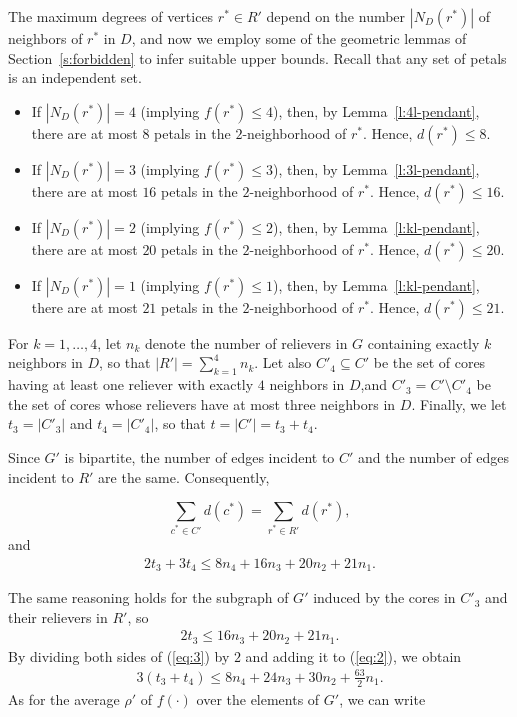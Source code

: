 \documentclass[preprint,12pt]{elsarticle}
\begin{document}
\begin{pf}
The maximum degrees of vertices $r^* \in R'$ depend on the number $|N_D(r^*)|$ of neighbors of $r^*$ in $D$, and now we employ some of the geometric lemmas of Section~\ref{s:forbidden} to infer suitable upper bounds. Recall that any set of petals is an independent set.
\begin{itemize}
\item If $|N_D(r^*)| = 4$ (implying $f(r^*) \leq 4$), then, by Lemma~\ref{l:4l-pendant}, there are at most $8$ petals in the $2$-neighborhood of $r^*$. Hence, $d(r^*) \leq 8$.
\item If $|N_D(r^*)| = 3$ (implying $f(r^*) \leq 3$), then, by Lemma~\ref{l:3l-pendant}, there are at most $16$ petals in the $2$-neighborhood of $r^*$. Hence, $d(r^*) \leq 16$.
\item If $|N_D(r^*)| = 2$ (implying $f(r^*) \leq 2$), then, by Lemma~\ref{l:kl-pendant}, there are at most $20$ petals in the $2$-neighborhood of $r^*$. Hence, $d(r^*) \leq 20$.
\item If $|N_D(r^*)| = 1$ (implying $f(r^*) \leq 1$), then, by Lemma~\ref{l:kl-pendant}, there are at most $21$ petals in the $2$-neighborhood of $r^*$. Hence, $d(r^*) \leq 21$.
\end{itemize}

For $k = 1, \ldots, 4$, let $n_k$ denote the number of relievers in $G$ containing exactly $k$ neighbors in $D$, so that $|R'| = \sum_{k=1}^4 n_k$. Let also $C'_4 \subseteq C'$ be the set of cores having at least one reliever with exactly $4$ neighbors in $D$,\linebreak and $C'_3 = C' \setminus C'_4$ be the set of cores whose relievers have at most three neighbors in $D$. Finally, we let $t_3 = |C'_3|$ and $t_4 = |C'_4|$, so that $t = |C'| = t_3 + t_4$.

Since $G'$ is bipartite, the number of edges incident to $C'$ and the number of edges incident to $R'$ are the same. Consequently, 

$$\sum_{c^* \in C'} d(c^*) = \sum_{r^* \in R'} d(r^*),$$ and
\begin{eqnarray}\label{eq:2}
2 t_3 + 3 t_4 \leq 8 n_4 + 16 n_3 + 20 n_2 + 21 n_1.
\end{eqnarray}

The same reasoning holds for the subgraph of $G'$ induced by the cores \linebreak in $C'_3$ and their relievers in $R'$, so
\begin{eqnarray}\label{eq:3}
2 t_3 \leq 16 n_3 + 20 n_2 + 21 n_1.
\end{eqnarray}
By dividing both sides of (\ref{eq:3}) by $2$ and adding it to (\ref{eq:2}), we obtain
\begin{eqnarray}\label{eq:4}
3(t_3 + t_4) \leq  8 n_4 + 24 n_3 + 30 n_2 + \frac{63}{2} n_1.
\end{eqnarray}
As for the average $\rho'$ of $f(\cdot)$ over the elements of $G'$, we can write


\end{pf}
\end{document}

